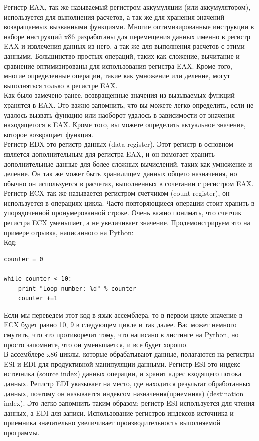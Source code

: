 \documentclass[12pt, a4paper, oneside]{book}
\begin{document}
Регистр EAX, так же называемый регистром аккумуляции (или аккумулятором), используется для выполнения расчетов, а так же для хранения значений возвращаемых вызванными функциями. Многие оптимизированные инструкции в наборе инструкций x86 разработаны для перемещения данных именно в регистр EAX и извлечения данных из него, а так же для выполнения расчетов с этими данными. Большинство простых операций, таких как сложение, вычитание и сравнение оптимизированы для использования регистра EAX. Кроме того, многие определенные операции, такие как умножение или деление, могут выполняться только в регистре EAX.\\

Как было замечено ранее, возвращенные значения из вызываемых функций хранятся в EAX. Это важно запомнить, что вы можете легко определить, если не удалось вызвать функцию или наоборот удалось в зависимости от значения находящегося в EAX. Кроме того, вы можете определить актуальное значение, которое возвращает функция.\\

Регистр EDX это регистр данных (data register). Этот регистр в основном является дополнительным для регистра EAX, и он помогает хранить дополнительные данные для более сложных вычислений, таких как умножение и деление. Он так же может быть хранилищем данных общего назначения, но обычно он используется в расчетах, выполненных в сочетании с регистром EAX.\\

Регистр ECX так же называется регистром-счетчиком (count register), он используется в операциях цикла. Часто повторяющиеся операции стоит хранить в упорядоченной пронумерованной строке. Очень важно понимать, что счетчик регистра ECX уменьшает, а не увеличивает значение. Продемонстрируем это на примере отрывка, написанного на Python:\\
Код:
\begin{verbatim}
counter = 0

while counter < 10:
    print "Loop number: %d" % counter
    counter +=1
\end{verbatim}
Если мы переведем этот код в язык ассемблера, то в первом цикле значение в ECX будет равно 10, 9 в следующем цикле и так далее. Вас может немного смутить, что это противоречит тому, что написано в листинге на Python, но просто запомните, что он уменьшается, и все будет хорошо.\\

В ассемблере x86 циклы, которые обрабатывают данные, полагаются на регистры ESI и EDI для продуктивной манипуляции данными. Регистр ESI это индекс источника (source index) данных операции, и хранит адрес входящего потока данных. Регистр EDI указывает на место, где находится результат обработанных данных, поэтому он называется индексом назначения(приемника) (destination index). Это легко запомнить таким образом: регистр ESI используется для чтения данных, а EDI для записи. Использование регистров индексов источника и приемника значительно увеличивает производительность выполняемой программы.\\
\end{document}
